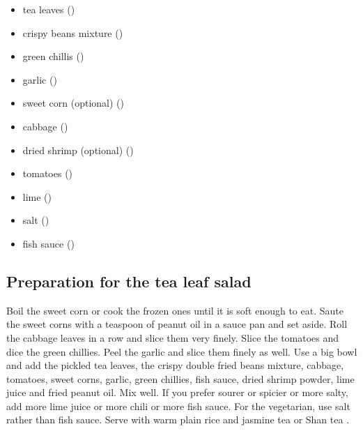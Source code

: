 \documentclass[conference]{IEEEtran}
\begin{document}
\renewcommand{\labelitemi}{$\textasteriskcentered$}
 \begin{itemize}
   \item  tea leaves ()
 \end{itemize}
 \begin{itemize}
   \item  crispy beans mixture ()
 \end{itemize}
\begin{itemize}
   \item  green chillis ()
 \end{itemize}
\begin{itemize}
   \item  garlic ()
 \end{itemize}
\begin{itemize}
   \item  sweet corn (optional) ()
 \end{itemize}
\begin{itemize}
   \item  cabbage ()
 \end{itemize}
\begin{itemize}
   \item  dried shrimp (optional) ()
 \end{itemize}
\begin{itemize}
   \item  tomatoes ()
 \end{itemize}
\begin{itemize}
   \item  lime ()
 \end{itemize}
\begin{itemize}
   \item  salt ()
 \end{itemize}
\begin{itemize}
   \item  fish sauce ()
 \end{itemize}

\subsection{Preparation for the tea leaf salad}
\label{subsec:LPTPreparation}
Boil the sweet corn or cook the frozen ones until it is soft enough to eat. Saute the sweet corns with a teaspoon of peanut oil in a sauce pan and set aside. Roll the cabbage leaves in a row and slice them very finely. Slice the tomatoes and dice the green chillies. Peel the garlic and slice them finely as well. Use a big bowl and add the pickled tea leaves, the crispy double fried beans mixture, cabbage, tomatoes, sweet corns, garlic, green chillies, fish sauce, dried shrimp powder, lime juice and fried peanut oil. Mix well. If you prefer sourer or spicier or more salty, add more lime juice or more chili or more fish sauce. For the vegetarian, use salt rather than fish sauce. Serve with warm plain rice and jasmine tea or Shan tea \cite{b8}.
\end{document}
